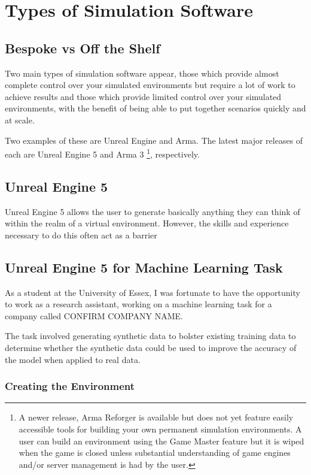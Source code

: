 \documentclass{article}
\begin{document}
\section{Types of Simulation Software}

\subsection{Bespoke vs Off the Shelf}

Two main types of simulation software appear, those which provide almost complete control over your simulated environments but require a lot of work to achieve results and those which provide limited control over your simulated environments, with the benefit of being able to put together scenarios quickly and at scale.

Two examples of these are Unreal Engine and Arma. The latest major releases of each are Unreal Engine 5 and Arma 3 \footnote{A newer release, Arma Reforger is available but does not yet feature easily accessible tools for building your own permanent simulation environments. A user can build an environment using the Game Master feature but it is wiped when the game is closed unless substantial understanding of game engines and/or server management is had by the user.}, respectively.

\subsection{Unreal Engine 5}

Unreal Engine 5 allows the user to generate basically anything they can think of within the realm of a virtual environment. However, the skills and experience necessary to do this often act as a barrier

\subsection{Unreal Engine 5 for Machine Learning Task}

As a student at the University of Essex, I was fortunate to have the opportunity to work as a research assistant, working on a machine learning task for a company called CONFIRM COMPANY NAME. 

The task involved generating synthetic data to bolster existing training data to determine whether the synthetic data could be used to improve the accuracy of the model when applied to real data. 

\subsubsection{Creating the Environment}
\end{document}
